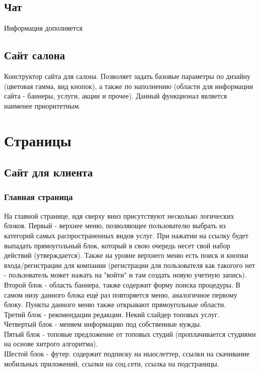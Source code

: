\documentclass[DIV=calc, paper=a4, fontsize=11pt]{scrartcl} %
\begin{document}
\subsection{Чат}
Информация дополняется

\subsection{Сайт салона}
Конструктор сайта для салона. Позволяет задать базовые параметры по дизайну (цветовая гамма, вид кнопок), а также по наполнению (области для информации сайта - баннеры, услуги, акции и прочее). Данный функционал является наименее приоритетным.

\section{Страницы}

\subsection{Сайт для клиента}

\subsubsection{Главная страница}

На главной странице, идя сверху вниз присутствуют несколько логических блоков. Первый - верхнее меню, позволяющее пользователю выбрать из категорий самых распространенных видов услуг. При нажатии на ссылку будет выпадать прямоугольный блок, который в свою очередь несет свой набор действий (утверждается). Также на уровне верхнего меню есть поиск и кнопки входа/регистрации для компании (регистрации для пользователя как такогого нет - пользователь может нажать на "войти" и там создать новую учетную запись).
\\Второй блок - область баннера, также содержит форму поиска процедуры. В самом низу данного блока ещё раз повторяется меню, аналогичное первому блоку. Пункты данного меню также открывают прямоугольные области.
\\Третий блок - рекомендации редакции. Некий слайдер топовых услуг.
\\Четвертый блок - меняем информацию под собственные нужды.
\\Пятый блок - топовые предложение от топовых студий (проплачивается студиями на основе хитрого алгоритма).
\\Шестой блок - футер: содержит подписку на ньюслеттер, ссылки на скачивание мобильных приложений, ссылки на соц.сети, ссылка на подстраницы.
\end{document}
